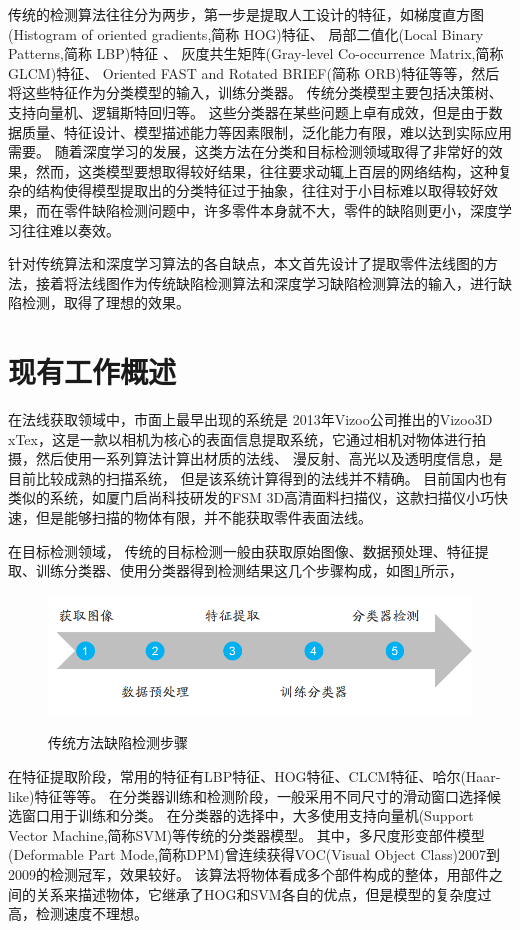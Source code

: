 传统的检测算法往往分为两步，第一步是提取人工设计的特征，如梯度直方图\cite{dalal2005histograms}(Histogram of oriented gradients,简称 HOG)特征、
局部二值化\cite{ojala2000gray}(Local Binary Patterns,简称 LBP)特征
、
灰度共生矩阵\cite{haralick1973textural}(Gray-level Co-occurrence Matrix,简称GLCM)特征、
Oriented FAST and Rotated BRIEF\cite{rublee2011orb}(简称 ORB)特征等等，然后将这些特征作为分类模型的输入，训练分类器。
传统分类模型主要包括决策树、支持向量机、逻辑斯特回归等。
这些分类器在某些问题上卓有成效，但是由于数据质量、特征设计、模型描述能力等因素限制，泛化能力有限，难以达到实际应用需要。
随着深度学习的发展，这类方法在分类和目标检测领域取得了非常好的效果，然而，这类模型要想取得较好结果，往往要求动辄上百层的网络结构，这种复杂的结构使得模型提取出的分类特征过于抽象，往往对于小目标难以取得较好效果，而在零件缺陷检测问题中，许多零件本身就不大，零件的缺陷则更小，深度学习往往难以奏效。

针对传统算法和深度学习算法的各自缺点，本文首先设计了提取零件法线图的方法，接着将法线图作为传统缺陷检测算法和深度学习缺陷检测算法的输入，进行缺陷检测，取得了理想的效果。

\section{现有工作概述}

在法线获取领域中，市面上最早出现的系统是
2013年Vizoo公司推出的Vizoo3D xTex，这是一款以相机为核心的表面信息提取系统，它通过相机对物体进行拍摄，然后使用一系列算法计算出材质的法线、
漫反射、高光以及透明度信息，是目前比较成熟的扫描系统，
但是该系统计算得到的法线并不精确。
目前国内也有
类似的系统，如厦门启尚科技研发的FSM 3D高清面料扫描仪，这款扫描仪小巧快
速，但是能够扫描的物体有限，并不能获取零件表面法线。

在目标检测领域，
传统的目标检测一般由获取原始图像、数据预处理、特征提取、训练分类器、使用分类器得到检测结果这几个步骤构成，如图\ref{chuantongjiancebuzhou}所示，
\begin{figure}[htbp]
\centering
\includegraphics[width=1.0\linewidth]{figures/chuantongjiance.jpg}\\
\caption{传统方法缺陷检测步骤}\label{chuantongjiancebuzhou}
\end{figure}
在特征提取阶段，常用的特征有LBP特征、HOG特征、CLCM特征、哈尔\cite{viola2001rapid}(Haar-like)特征等等。
在分类器训练和检测阶段，一般采用不同尺寸的滑动窗口选择候选窗口用于训练和分类。
在分类器的选择中，大多使用支持向量机\cite{hearst1998support}(Support Vector Machine,简称SVM)等传统的分类器模型。
其中，多尺度形变部件模型\cite{felzenszwalb2010object}(Deformable Part Mode,简称DPM)曾连续获得VOC(Visual Object Class)2007到2009的检测冠军，效果较好。
该算法将物体看成多个部件构成的整体，用部件之间的关系来描述物体，它继承了HOG和SVM各自的优点，但是模型的复杂度过高，检测速度不理想。

